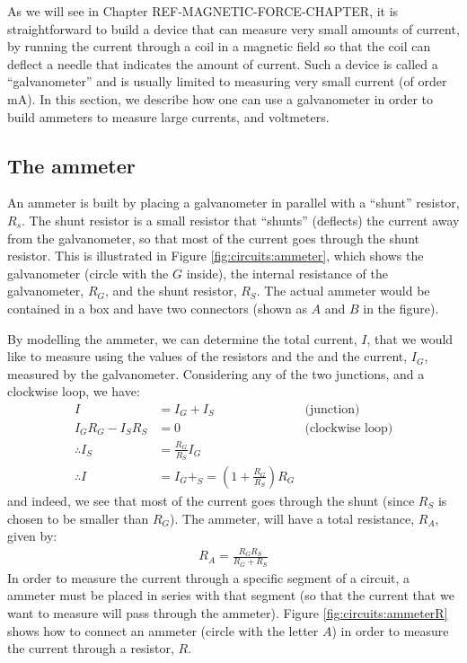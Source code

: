 As we will see in Chapter REF-MAGNETIC-FORCE-CHAPTER, it is straightforward to build a device that can measure very small amounts of current, by running the current through a coil in a magnetic field so that the coil can deflect a needle that indicates the amount of current. Such a device is called a ``galvanometer'' and is usually limited to measuring very small current (of order \si{mA}). In this section, we describe how one can use a galvanometer in order to build ammeters to measure large currents, and voltmeters. 
\subsection{The ammeter}
An ammeter is built by placing a galvanometer in parallel with a ``shunt'' resistor, $R_s$. The shunt resistor is a small resistor that ``shunts'' (deflects) the current away from the galvanometer, so that most of the current goes through the shunt resistor. This is illustrated in Figure \ref{fig:circuits:ammeter}, which shows the galvanometer (circle with the $G$ inside), the internal resistance of the galvanometer, $R_G$, and the shunt resistor, $R_S$. The actual ammeter would be contained in a box and have two connectors (shown as $A$ and $B$ in the figure). 


By modelling the ammeter, we can determine the total current, $I$, that we would like to measure using the values of the resistors and the and the current, $I_G$, measured by the galvanometer. Considering any of the two junctions, and a clockwise loop, we have:
\begin{align*}
I&=I_G+I_S \quad&\text{(junction)}\\
I_GR_G-I_SR_S&=0\quad&\text{(clockwise loop)}\\
\therefore I_S&=\frac{R_G}{R_S}I_G\\
\therefore I &= I_G+_S=\left(1+\frac{R_G}{R_S}\right) R_G
\end{align*}  
and indeed, we see that most of the current goes through the shunt (since $R_S$ is chosen to be smaller than $R_G$). The ammeter, will have a total resistance, $R_A$, given by:
\begin{align*}
R_A=\frac{R_GR_S}{R_G+R_S}
\end{align*}
In order to measure the current through a specific segment of a circuit, a ammeter must be placed in series with that segment (so that the current that we want to measure will pass through the ammeter). Figure \ref{fig:circuits:ammeterR} shows how to connect an ammeter (circle with the letter $A$) in order to measure the current through a resistor, $R$.

